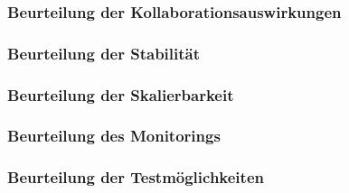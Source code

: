 \documentclass[a4paper,twoside,11pt, pagesize]{scrartcl}
\begin{document}







 




\subsubsection{Beurteilung der Kollaborationsauswirkungen}
\subsubsection{Beurteilung der Stabilität}
\subsubsection{Beurteilung der Skalierbarkeit} 
\subsubsection{Beurteilung des Monitorings}
\subsubsection{Beurteilung der Testmöglichkeiten} 
\end{document}
